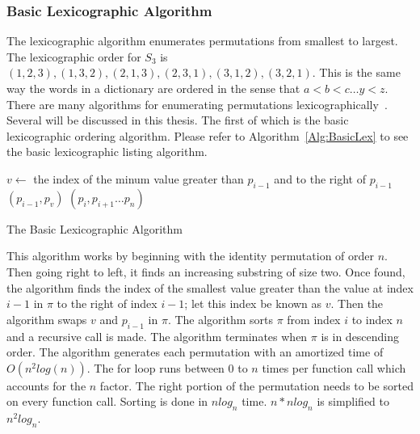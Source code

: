 \subsubsection{Basic Lexicographic Algorithm}
The lexicographic algorithm enumerates permutations from smallest to largest. The lexicographic order for $S_{3}$ is $(1,2,3),(1,3,2),(2,1,3),(2,3,1),(3,1,2),(3,2,1)$.
This is the same way the words in a dictionary are ordered in the sense that $a < b < c \dots y < z$.
There are many algorithms for enumerating permutations lexicographically~\cite{A19, A20, A21, A22, A23}. 
Several will be discussed in this thesis. The first of which is the basic lexicographic ordering algorithm.
Please refer to Algorithm~\ref{Alg:BasicLex} to see the basic lexicographic listing algorithm.\pagebreak
\begin{algorithm}
    \begin{algorithmic}[1]
                    \State \small{$v \gets$ the index of the minum value greater than $p_{i-1}$ and
                    to the right of $p_{i-1}$}
                    $(p_{i-1}, p_{v})$
                    $(p_{i},p_{i+1} \dots p_{n})$
                   
                \EndIf
            \EndFor
          

        \EndFunction
        
    \end{algorithmic}
    \caption{The Basic Lexicographic Algorithm}
    \label{Alg:BasicLex}
\end{algorithm}
This algorithm works by beginning with the identity permutation of order $n$. Then going right to left, 
it finds an increasing substring of size two. Once found, the algorithm finds the index of the smallest value greater than the 
value at index $i-1$ in $\pi$ to the right of index $i-1$; let this index be known as $v$. 
Then the algorithm swaps $v$ and $p_{i-1}$ in $\pi$. The algorithm sorts $\pi$ from index $i$ to index $n$ and a recursive call is made.
The algorithm terminates when $\pi$ is in descending order. The 
algorithm generates each permutation with an amortized time of 
$O(n^{2}log(n))$. The for loop runs between $0$ to $n$ times per function call which accounts for the $n$ factor. 
The right portion of the permutation needs to be sorted on every function call. Sorting is done in $nlog_{n}$ time. 
$n*nlog_{n}$ is simplified to $n^{2}log_{n}$.




